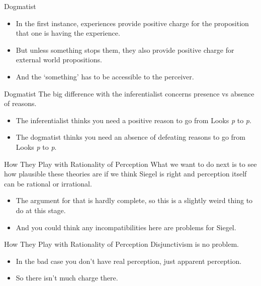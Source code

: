 \documentclass[
  17pt,
  letterpaper,
  ignorenonframetext,
  aspectratio=169,
  xcolor={dvipsnames}]{beamer}
\providecommand{\tightlist}{%
  \setlength{\itemsep}{0pt}\setlength{\parskip}{0pt}}\usepackage{longtable,booktabs,array}
\begin{document}
\begin{frame}{Dogmatist}
\protect\hypertarget{dogmatist}{}
\begin{itemize}[<+->]
\tightlist
\item
  In the first instance, experiences provide positive charge for the
  proposition that one is having the experience.
\item
  But unless something stops them, they also provide positive charge for
  external world propositions.
\item
  And the `something' has to be accessible to the perceiver.
\end{itemize}
\end{frame}

\begin{frame}{Dogmatist}
\protect\hypertarget{dogmatist-1}{}
The big difference with the inferentialist concerns presence vs absence
of reasons.

\begin{itemize}[<+->]
\tightlist
\item
  The inferentialist thinks you need a positive reason to go from Looks
  \emph{p} to \emph{p}.
\item
  The dogmatist thinks you need an absence of defeating reasons to go
  from Looks \emph{p} to \emph{p}.
\end{itemize}
\end{frame}

\begin{frame}{How They Play with Rationality of Perception}
\protect\hypertarget{how-they-play-with-rationality-of-perception}{}
What we want to do next is to see how plausible these theories are if we
think Siegel is right and perception itself can be rational or
irrational.

\begin{itemize}[<+->]
\tightlist
\item
  The argument for that is hardly complete, so this is a slightly weird
  thing to do at this stage.
\item
  And you could think any incompatibilities here are problems for
  Siegel.
\end{itemize}
\end{frame}

\begin{frame}{How They Play with Rationality of Perception}
\protect\hypertarget{how-they-play-with-rationality-of-perception-1}{}
Disjunctivism is no problem.

\begin{itemize}[<+->]
\tightlist
\item
  In the bad case you don't have real perception, just apparent
  perception.
\item
  So there isn't much charge there.
\end{itemize}
\end{frame}
\end{document}
